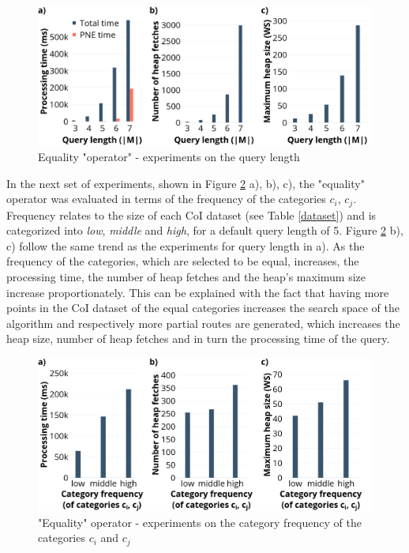 \begin{figure}[H]
	\includegraphics[scale=0.33]{images/eo_length_30.png}
	\centering
	\caption{Equality "operator" - experiments on the query length}
	\label{fig:eo_length}
\end{figure}

In the next set of experiments, shown in Figure \ref{fig:eo_frequency} a), b), c), the "equality" operator was evaluated in terms of the frequency of the categories $c_i$, $c_j$. Frequency relates to the size of each CoI dataset (see Table \ref{dataset}) and is categorized into \textit{low}, \textit{middle} and \textit{high}, for a default query length of 5. Figure \ref{fig:eo_frequency} b), c) follow the same trend as the experiments for query length in a). As the frequency of the categories, which are selected to be equal, increases, the processing time, the number of heap fetches and the heap's maximum size increase proportionately. This can be explained with the fact that having more points in the CoI dataset of the equal categories increases the search space of the algorithm and respectively more partial routes are generated, which increases the heap size, number of heap fetches and in turn the processing time of the query.

\begin{figure}[h!]
	\includegraphics[scale=0.33]{images/eo_frequency_30.png}
	\centering
	\caption{"Equality" operator - experiments on the category frequency of the categories $c_i$ and $c_j$}
	\label{fig:eo_frequency}
\end{figure}

